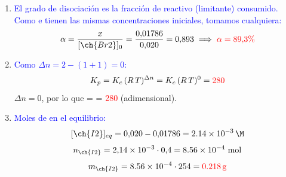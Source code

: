 \begin{exerciseEVAU}
\begin{solu}
    \begin{enumerate}[label=\letraminuscula]
        \item \textcolor{blue}{El grado de disociación es la fracción de reactivo (limitante) consumido. Como  e  tienen las mismas concentraciones iniciales, tomamos cualquiera:}
        \[
            \alpha = \frac{x}{[\ch{Br2}]_0} = \frac{0{,}01786}{0{,}020} = 0{,}893 \implies \textcolor{red}{\alpha = 89{,}3\%}
        \]

        \item \textcolor{blue}{Como \(\Delta n = 2 - (1+1) = 0\):}
        \[
            K_p = K_c\,(R\,T)^{\Delta n} = K_c\,(R\,T)^0 = \textcolor{red}{280}
        \]
        \(\Delta n = 0\), por lo que \Kp{} = \Kc{} = \textcolor{red}{280} (adimensional).

        \item \textcolor{blue}{Moles de  en el equilibrio:}
        \[
            [\ch{I2}]_{eq} = 0{,}020 - 0{,}01786 = \qty{2{,}14e-3}{\M}
        \]
        \[
            n_{\ch{I2}} = 2{,}14\times10^{-3} \cdot 0{,}4 = \num{8{,}56e-4} \text{ mol}
        \]
        \[
            m_{\ch{I2}} = \num{8{,}56e-4} \cdot 254 = \textcolor{red}{\qty{0{,}218}{\g}}
        \]
    \end{enumerate}

    \end{solu}
\end{exerciseEVAU}


